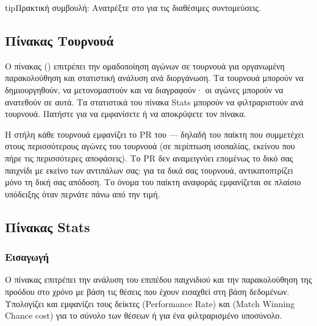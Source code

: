 \documentclass[letterpaper,10pt,greek]{sphinxmanual}
\begin{document}
\begin{sphinxadmonition}{tip}{Πρακτική συμβουλή:}
\sphinxAtStartPar
Ανατρέξτε στο {\hyperref[\detokenize{raccourcis:raccourcis}]{}} για τις διαθέσιμες συντομεύσεις.
\end{sphinxadmonition}


\subsection{Πίνακας Τουρνουά}
\label{\detokenize{manuel:panneau-tournois}}\label{\detokenize{manuel:id8}}
\sphinxAtStartPar
Ο πίνακας  () επιτρέπει την ομαδοποίηση αγώνων σε τουρνουά για οργανωμένη παρακολούθηση και στατιστική ανάλυση ανά διοργάνωση. Τα τουρνουά μπορούν να δημιουργηθούν, να μετονομαστούν και να διαγραφούν· οι αγώνες μπορούν να ανατεθούν σε αυτά. Τα στατιστικά του πίνακα Stats μπορούν να φιλτραριστούν ανά τουρνουά. Πατήστε  για να εμφανίσετε ή να αποκρύψετε τον πίνακα.

\sphinxAtStartPar
Η στήλη  κάθε τουρνουά εμφανίζει το PR του  — δηλαδή του παίκτη που συμμετέχει στους περισσότερους αγώνες του τουρνουά (σε περίπτωση ισοπαλίας, εκείνου που πήρε τις περισσότερες αποφάσεις). Το PR δεν αναμειγνύει επομένως το δικό σας παιχνίδι με εκείνο των αντιπάλων σας: για τα δικά σας τουρνουά, αντικατοπτρίζει μόνο τη δική σας απόδοση. Το όνομα του παίκτη αναφοράς εμφανίζεται σε πλαίσιο υπόδειξης όταν περνάτε πάνω από την τιμή.


\subsection{Πίνακας Stats}
\label{\detokenize{manuel:panneau-stats}}\label{\detokenize{manuel:stats}}

\subsubsection{Εισαγωγή}
\label{\detokenize{manuel:id9}}
\sphinxAtStartPar
Ο πίνακας  επιτρέπει την ανάλυση του επιπέδου παιχνιδιού και την παρακολούθηση της προόδου στο χρόνο με βάση τις θέσεις που έχουν εισαχθεί στη βάση δεδομένων. Υπολογίζει και εμφανίζει τους δείκτες  (Performance Rate) και  (Match Winning Chance cost) για το σύνολο των θέσεων ή για ένα φιλτραρισμένο υποσύνολο.
\end{document}

